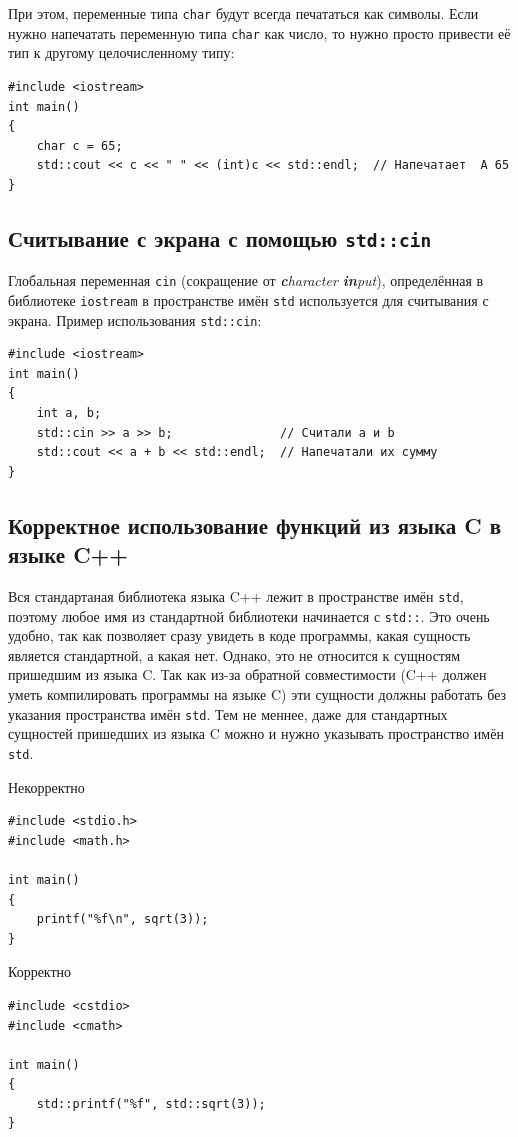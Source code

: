 \documentclass{article}
\begin{document}
При этом, переменные типа \texttt{char} будут всегда печататься как символы. Если нужно напечатать переменную типа \texttt{char} как число, то нужно просто привести её тип к другому целочисленному типу:
\begin{lstlisting}
#include <iostream>
int main() 
{
    char c = 65;
    std::cout << c << " " << (int)c << std::endl;  // Напечатает  A 65
}
\end{lstlisting}


\subsection*{Считывание с экрана с помощью \texttt{std::cin}}
Глобальная переменная \texttt{cin} (сокращение от \textit{\textbf{c}haracter \textbf{in}put}), определённая в библиотеке \texttt{iostream} в пространстве имён \texttt{std} используется для считывания с экрана. Пример использования \texttt{std::cin}:
\begin{lstlisting}
#include <iostream>
int main() 
{
    int a, b;
    std::cin >> a >> b;               // Считали a и b
    std::cout << a + b << std::endl;  // Напечатали их сумму
}
\end{lstlisting}
\subsection*{Корректное использование функций из языка C в языке C++}
Вся стандартаная библиотека языка C++ лежит в пространстве имён \texttt{std}, поэтому любое имя из стандартной библиотеки начинается с \texttt{std::}. Это очень удобно, так как позволяет сразу увидеть в коде программы, какая сущность является стандартной, а какая нет. Однако, это не относится к сущностям пришедшим из языка C. Так как из-за обратной совместимости (C++ должен уметь компилировать программы на языке C) эти сущности должны работать без указания пространства имён \texttt{std}. Тем не меннее, даже для стандартных сущностей пришедших из языка C можно и нужно указывать пространство имён \texttt{std}.\\

\begin{minipage}{0.45\textwidth}
\quad \quad Некорректно
\begin{lstlisting}
#include <stdio.h>
#include <math.h>

int main() 
{
    printf("%f\n", sqrt(3));
}
\end{lstlisting}
\end{minipage}
\begin{minipage}{0.45\textwidth}
\quad \quad Корректно
\begin{lstlisting}
#include <cstdio>
#include <cmath>

int main() 
{
    std::printf("%f", std::sqrt(3));
}
\end{lstlisting}
\end{minipage}
\end{document}
